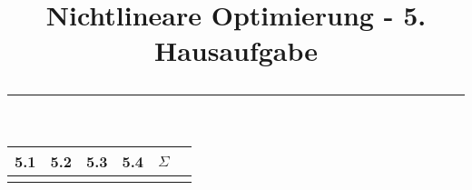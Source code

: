 \documentclass[11p,a4paper]{article}
\begin{document}
\title{\textbf{Nichtlineare Optimierung - 5. Hausaufgabe} \\ \rule{\textwidth}{1pt}}
\date{}

\clearpage\maketitle
\thispagestyle{empty}
\ourtitle
\setcounter{page}{0}


\vspace{2.5cm}
\begin{center}
\huge
\begin{tabular}{c*{4}{|c}||c}
5.1 & 5.2 & 5.3 & 5.4 & $\Sigma$ \\\hline
&&&& \\
\end{tabular}
\end{center}
\vspace{2cm}





\end{document}
